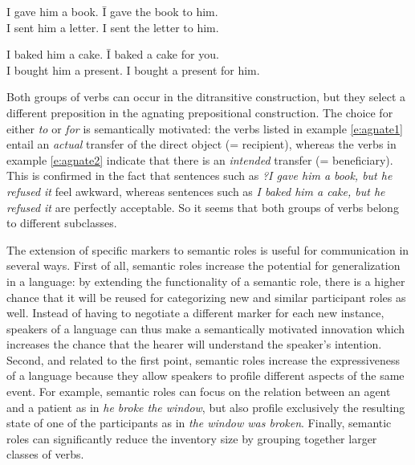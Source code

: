 \ea
\label{e:agnate1}
\begin{tabbing}
I gave him a book. \hspace{2cm} \= I gave the book to him.
\\ I sent him a letter. \> I sent the letter to him.
\end{tabbing}
\z
\ea
\label{e:agnate2}
\begin{tabbing}
I baked him a cake. \hspace{1,85cm} \= I baked a cake for you.
\\I bought him a present. \> I bought a present for him.
\end{tabbing}
\z

Both groups of verbs can occur in the ditransitive construction, but they select a different preposition in the agnating prepositional construction. The choice for either {\em to} or {\em for} is semantically motivated: the verbs listed in example \ref{e:agnate1} entail an {\em actual} transfer of the direct object (= recipient), whereas the verbs in example \ref{e:agnate2} indicate that there is an {\em intended} transfer (= beneficiary). This is confirmed in the fact that sentences such as {\em ?I gave him a book, but he refused it} feel awkward, whereas sentences such as {\em I baked him a cake, but he refused it} are perfectly acceptable. So it seems that both groups of verbs belong to different subclasses.

The extension of specific markers to semantic roles is useful for communication in several ways. First of all, semantic roles increase the potential for generalization in a language: by extending the functionality of a semantic role, there is a higher chance that it will be reused for categorizing new and similar participant roles as well. Instead of having to negotiate a different marker for each new instance, speakers of a language can thus make a semantically motivated innovation which increases the chance that the hearer will understand the speaker's intention. Second, and related to the first point, semantic roles increase the expressiveness of a language because they allow speakers to profile different aspects of the same event. For example, semantic roles can focus on the relation between an agent and a patient as in {\em he broke the window}, but also profile exclusively the resulting state of one of the participants as in {\em the window was broken}. Finally, semantic roles can significantly reduce the inventory size by grouping together larger classes of verbs.

